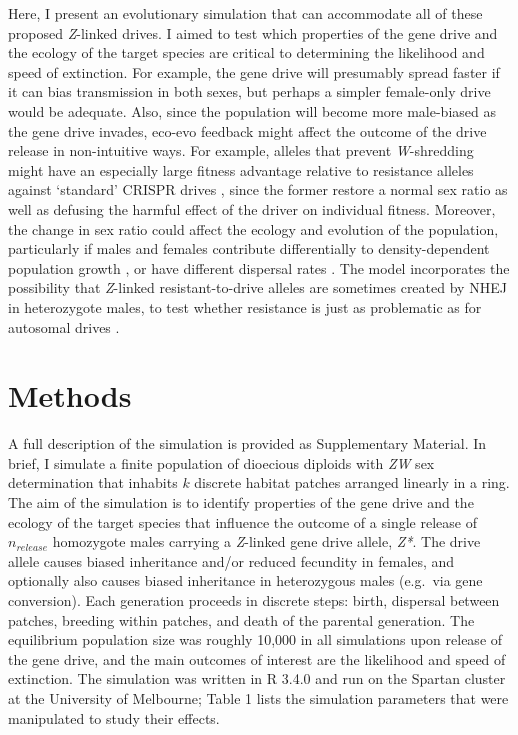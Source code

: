 \documentclass[]{rsos}%
\begin{document}
Here, I present an evolutionary simulation that can accommodate all of
these proposed \emph{Z}-linked drives. I aimed to test which properties
of the gene drive and the ecology of the target species are critical to
determining the likelihood and speed of extinction. For example, the
gene drive will presumably spread faster if it can bias transmission in
both sexes, but perhaps a simpler female-only drive would be adequate.
Also, since the population will become more male-biased as the gene
drive invades, eco-evo feedback might affect the outcome of the drive
release in non-intuitive ways. For example, alleles that prevent
\emph{W}-shredding might have an especially large fitness advantage
relative to resistance alleles against `standard' CRISPR drives
\citep[see][]{unckless2017ev, drury2017cr}, since the former restore a
normal sex ratio as well as defusing the harmful effect of the driver on
individual fitness. Moreover, the change in sex ratio could affect the
ecology and evolution of the population, particularly if males and
females contribute differentially to density-dependent population growth
\citep{rankin2007ma, li2019int}, or have different dispersal rates
\citep{li2019sex}. The model incorporates the possibility that
\emph{Z}-linked resistant-to-drive alleles are sometimes created by NHEJ
in heterozygote males, to test whether resistance is just as problematic
as for autosomal drives
\citep{gantz2015mu, gantz2015hi, hammond2016cr, wang2016cr, unckless2017ev}.

\hypertarget{methods}{%
\section{Methods}\label{methods}}

A full description of the simulation is provided as Supplementary
Material. In brief, I simulate a finite population of dioecious diploids
with \emph{ZW} sex determination that inhabits \(k\) discrete habitat
patches arranged linearly in a ring. The aim of the simulation is to
identify properties of the gene drive and the ecology of the target
species that influence the outcome of a single release of
\(n_{release}\) homozygote males carrying a \emph{Z}-linked gene drive
allele, \emph{Z*}. The drive allele causes biased inheritance and/or
reduced fecundity in females, and optionally also causes biased
inheritance in heterozygous males (e.g.~via gene conversion). Each
generation proceeds in discrete steps: birth, dispersal between patches,
breeding within patches, and death of the parental generation. The
equilibrium population size was roughly 10,000 in all simulations upon
release of the gene drive, and the main outcomes of interest are the
likelihood and speed of extinction. The simulation was written in R
3.4.0 and run on the Spartan cluster at the University of Melbourne;
Table 1 lists the simulation parameters that were manipulated to study
their effects.
\end{document}
